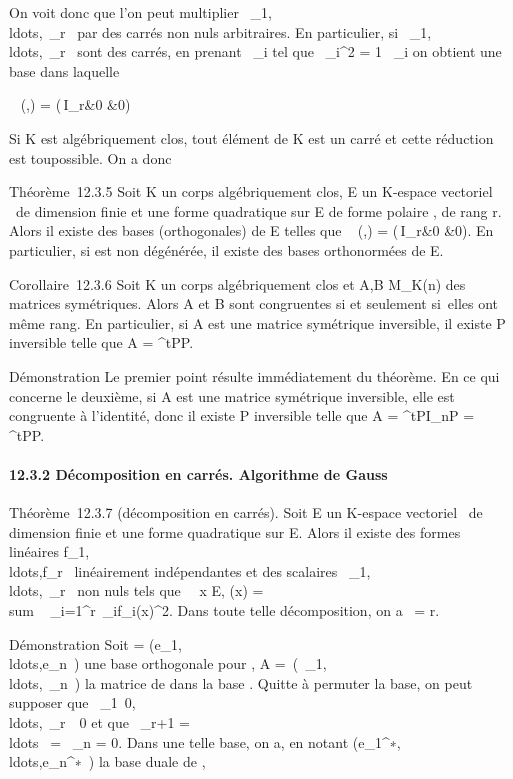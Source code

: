 \documentclass[]{article}
\begin{document}
On voit donc que l'on peut multiplier
\alpha~\_1,\\ldots,\alpha~\_r~
par des carrés non nuls arbitraires. En particulier, si
\alpha~\_1,\\ldots,\alpha~\_r~
sont des carrés, en prenant \lambda~\_i tel que \lambda~\_i^2
= 1 \over \alpha~\_i on obtient une base dans
laquelle

\mathrmMat~ (\phi,) =
\left
(\matrix\,I\_r&0
 &0\right )

Si K est algébriquement clos, tout élément de K est un carré et cette
réduction est tou\jmathours possible. On a donc

Théorème~12.3.5 Soit K un corps algébriquement clos, E un K-espace
vectoriel ~de dimension finie et \Phi une forme quadratique sur E de forme
polaire \phi, de rang r. Alors il existe des bases (orthogonales) de E
telles que \mathrmMat~ (\phi,)
= \left
(\matrix\,I\_r&0
 &0\right ). En particulier, si \Phi
est non dégénérée, il existe des bases orthonormées de E.

Corollaire~12.3.6 Soit K un corps algébriquement clos et A,B \in
M\_K(n) des matrices symétriques. Alors A et B sont congruentes
si et seulement si~elles ont même rang. En particulier, si A est une
matrice symétrique inversible, il existe P inversible telle que A =
^tPP.

Démonstration Le premier point résulte immédiatement du théorème. En ce
qui concerne le deuxième, si A est une matrice symétrique inversible,
elle est congruente à l'identité, donc il existe P inversible telle que
A = ^tPI\_nP = ^tPP.

\paragraph{12.3.2 Décomposition en carrés. Algorithme de Gauss}

Théorème~12.3.7 (décomposition en carrés). Soit E un K-espace vectoriel
~de dimension finie et \Phi une forme quadratique sur E. Alors il existe
des formes linéaires
f\_1,\\ldots,f\_r~
linéairement indépendantes et des scalaires
\alpha~\_1,\\ldots,\alpha~\_r~
non nuls tels que \forall~~x \in E, \Phi(x)
= \\sum ~
\_i=1^r\alpha~\_if\_i(x)^2. Dans toute
telle décomposition, on a
\mathrmrg~\Phi = r.

Démonstration Soit  =
(e\_1,\\ldots,e\_n~)
une base orthogonale pour \Phi, A =\
\mathrmdiag(\alpha~\_1,\\ldots,\alpha~\_n~)
la matrice de \Phi dans la base . Quitte à permuter la base, on peut
supposer que
\alpha~\_1\neq~0,\\ldots,\alpha~\_r\mathrel\neq~~0
et que \alpha~\_r+1 =
\\ldots~ =
\alpha~\_n = 0. Dans une telle base, on a, en notant
(e\_1^∗,\\ldots,e\_n^∗~)
la base duale de ,
\end{document}
